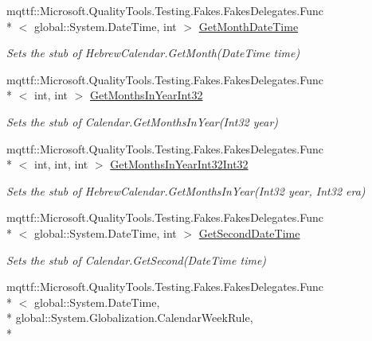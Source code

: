 \begin{DoxyCompactItemize}
mqttf\-::\-Microsoft.\-Quality\-Tools.\-Testing.\-Fakes.\-Fakes\-Delegates.\-Func\\*
$<$ global\-::\-System.\-Date\-Time, int $>$ \hyperlink{class_system_1_1_globalization_1_1_fakes_1_1_stub_hebrew_calendar_ab429e3c5c498d11df91cfeb896b07e6f}{Get\-Month\-Date\-Time}
\begin{DoxyCompactList}\small\item\em Sets the stub of Hebrew\-Calendar.\-Get\-Month(\-Date\-Time time)\end{DoxyCompactList}\item 
mqttf\-::\-Microsoft.\-Quality\-Tools.\-Testing.\-Fakes.\-Fakes\-Delegates.\-Func\\*
$<$ int, int $>$ \hyperlink{class_system_1_1_globalization_1_1_fakes_1_1_stub_hebrew_calendar_a5269004b21c552a1956b40e0147c82ae}{Get\-Months\-In\-Year\-Int32}
\begin{DoxyCompactList}\small\item\em Sets the stub of Calendar.\-Get\-Months\-In\-Year(\-Int32 year)\end{DoxyCompactList}\item 
mqttf\-::\-Microsoft.\-Quality\-Tools.\-Testing.\-Fakes.\-Fakes\-Delegates.\-Func\\*
$<$ int, int, int $>$ \hyperlink{class_system_1_1_globalization_1_1_fakes_1_1_stub_hebrew_calendar_aea603037be83e7b0c46d2370988109f9}{Get\-Months\-In\-Year\-Int32\-Int32}
\begin{DoxyCompactList}\small\item\em Sets the stub of Hebrew\-Calendar.\-Get\-Months\-In\-Year(\-Int32 year, Int32 era)\end{DoxyCompactList}\item 
mqttf\-::\-Microsoft.\-Quality\-Tools.\-Testing.\-Fakes.\-Fakes\-Delegates.\-Func\\*
$<$ global\-::\-System.\-Date\-Time, int $>$ \hyperlink{class_system_1_1_globalization_1_1_fakes_1_1_stub_hebrew_calendar_a6e9b4a684c65a400e6212644b7849147}{Get\-Second\-Date\-Time}
\begin{DoxyCompactList}\small\item\em Sets the stub of Calendar.\-Get\-Second(\-Date\-Time time)\end{DoxyCompactList}\item 
mqttf\-::\-Microsoft.\-Quality\-Tools.\-Testing.\-Fakes.\-Fakes\-Delegates.\-Func\\*
$<$ global\-::\-System.\-Date\-Time, \\*
global\-::\-System.\-Globalization.\-Calendar\-Week\-Rule, \\*

\end{DoxyCompactItemize}
